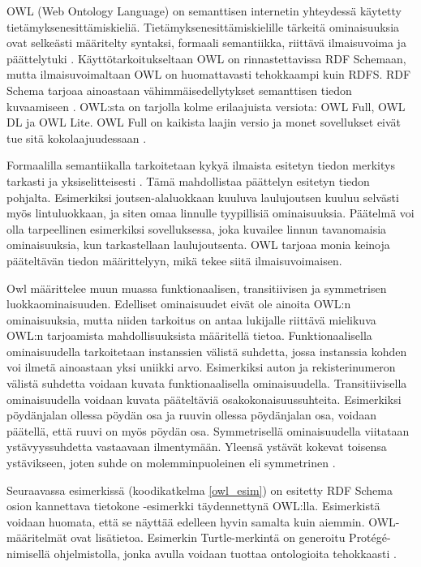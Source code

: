 \documentclass[finnish, 12pt, a4paper, elec, utf8, pdfa, online]{aaltothesis}
\begin{document}
{OWL (Web Ontology Language) on semanttisen internetin yhteydessä käytetty tietämyksenesittämiskieliä. Tietämyksenesittämiskielille tärkeitä ominaisuuksia ovat selkeästi määritelty syntaksi, formaali semantiikka, riittävä ilmaisuvoima ja päättelytuki \cite{Antoniou}. Käyttötarkoitukseltaan OWL on rinnastettavissa RDF Schemaan, mutta ilmaisuvoimaltaan OWL on huomattavasti tehokkaampi kuin RDFS. RDF Schema tarjoaa ainoastaan vähimmäisedellytykset semanttisen tiedon kuvaamiseen \cite{revisited}. OWL:sta on tarjolla kolme erilaajuista versiota: OWL Full, OWL DL ja OWL Lite. OWL Full on kaikista laajin versio ja monet sovellukset eivät tue sitä kokolaajuudessaan \cite{OWL_specification}.

Formaalilla semantiikalla tarkoitetaan kykyä ilmaista esitetyn tiedon merkitys tarkasti ja yksiselitteisesti \cite{Antoniou}. Tämä mahdollistaa päättelyn esitetyn tiedon pohjalta. Esimerkiksi joutsen-alaluokkaan kuuluva laulujoutsen kuuluu selvästi myös lintuluokkaan, ja siten omaa linnulle tyypillisiä ominaisuuksia. Päätelmä voi olla tarpeellinen esimerkiksi sovelluksessa, joka kuvailee linnun tavanomaisia ominaisuuksia, kun tarkastellaan laulujoutsenta. OWL tarjoaa monia keinoja pääteltävän tiedon määrittelyyn, mikä tekee siitä ilmaisuvoimaisen.

Owl määrittelee muun muassa funktionaalisen, transitiivisen ja symmetrisen luokkaominaisuuden. Edelliset ominaisuudet eivät ole ainoita OWL:n ominaisuuksia, mutta niiden tarkoitus on antaa lukijalle riittävä mielikuva OWL:n tarjoamista mahdollisuuksista määritellä tietoa. Funktionaalisella ominaisuudella tarkoitetaan instanssien välistä suhdetta, jossa instanssia kohden voi ilmetä ainoastaan yksi uniikki arvo. Esimerkiksi auton ja rekisterinumeron välistä suhdetta voidaan kuvata funktionaalisella ominaisuudella. Transitiivisella ominaisuudella voidaan kuvata pääteltäviä osakokonaisuussuhteita. Esimerkiksi pöydänjalan ollessa pöydän osa ja ruuvin ollessa pöydänjalan osa, voidaan päätellä, että ruuvi on myös pöydän osa. Symmetrisellä ominaisuudella viitataan ystävyyssuhdetta vastaavaan ilmentymään. Yleensä ystävät kokevat toisensa ystävikseen, joten suhde on molemminpuoleinen eli symmetrinen \cite{OWL_specification}.



Seuraavassa esimerkissä (koodikatkelma \ref{owl_esim}) on esitetty RDF Schema osion kannettava tietokone -esimerkki täydennettynä OWL:lla. Esimerkistä voidaan huomata, että se näyttää edelleen hyvin samalta kuin aiemmin. OWL-määritelmät ovat lisätietoa. Esimerkin Turtle-merkintä on generoitu Protégé-nimisellä ohjelmistolla, jonka avulla voidaan tuottaa ontologioita tehokkaasti \cite{Protege}.

}
\end{document}
